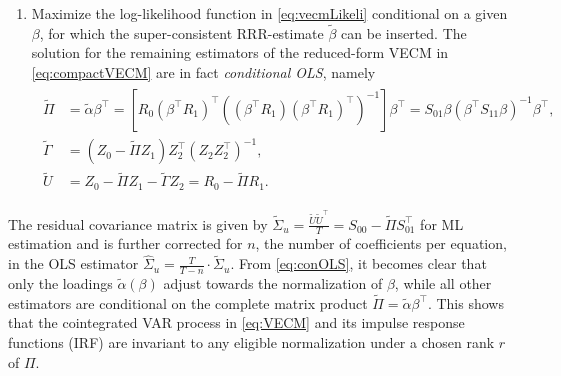 \begin{enumerate}[label=\textbf{\arabic*.}]
	\item Maximize the log-likelihood function in \eqref{eq:vecmLikeli} conditional on a given $ \beta $, for which the super-consistent RRR-estimate $ \widetilde{\beta} $ can be inserted. The solution for the remaining estimators of the reduced-form VECM in \eqref{eq:compactVECM} are in fact \textit{conditional OLS}, namely
	\begin{align} \label{eq:conOLS}
	\begin{split}
		\widetilde{\Pi} & = \widetilde{\alpha} \beta^\top = \left[ R^{\ }_0 \left( \beta^\top R^{\ }_1 \right)^\top \left( \left( \beta^\top R^{\ }_1 \right) \left( \beta^\top R^{\ }_1 \right)^\top \right)^{-1} \right] \beta^\top = S_{01} \beta \left( \beta^\top S_{11} \beta \right)^{-1} \beta^\top, \\
		\widetilde{\Gamma} & = \left( Z^{\ }_0 - \widetilde{\Pi} Z^{\ }_1 \right) Z_2^\top ( Z^{\ }_2 Z_2^\top )^{-1}, \\
		\widetilde{U} & = Z^{\ }_0 - \widetilde{\Pi} Z^{\ }_1 - \widetilde{\Gamma} Z^{\ }_2 = R^{\ }_0 - \widetilde{\Pi} R^{\ }_1.
	\end{split}
	\end{align}
\end{enumerate}
The residual covariance matrix is given by $ \widetilde{\Sigma}_u = \frac{\widetilde{U} \widetilde{U}^\top}{T} = S_{00} - \widetilde{\Pi} S_{01}^\top $ for ML estimation and is further corrected for $ n $, the number of coefficients per equation, in the OLS estimator $ \widehat{\Sigma}_u = \frac{T}{T-n} \cdot \widetilde{\Sigma}_u $. From \eqref{eq:conOLS}, it becomes clear that only the loadings $ \widetilde{\alpha}(\beta) $ adjust towards the normalization of $ \beta $, while all other estimators are conditional on the complete matrix product $ \widetilde{\Pi} = \widetilde{\alpha} \beta^\top $. This shows that the cointegrated VAR process in \eqref{eq:VECM} and its impulse response functions (IRF) are invariant to any eligible normalization under a chosen rank $ r $ of $ \Pi $.


